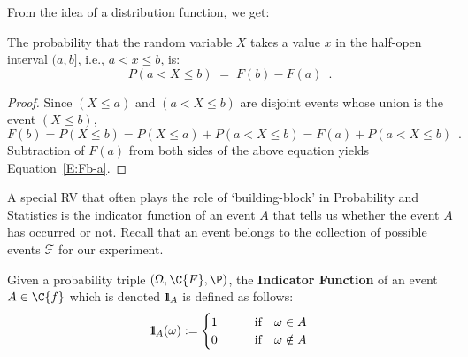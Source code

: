 From the idea of a distribution function, we get:

\begin{framed}
\begin{prop}
The probability that the random variable $X$ takes a value $x$ in the half-open interval $(a,b]$, i.e., $a < x \leq b$, is:
\begin{equation}\label{E:Fb-a}
P(a < X \leq b)\; = \;F(b) - F(a)\enspace .
\end{equation}
\end{prop}
\end{framed}

{\scriptsize
\begin{proof}
Since  $(X \leq a)$ and $(a < X \leq b)$ are disjoint events whose union is the event $(X \leq b)$,
\[
F(b)  = P(X \leq b) = P(X \leq a) + P(a < X \leq b) = F(a) + P (a < X \leq b) \enspace .
\]
Subtraction of $F(a)$ from both sides of the above equation yields
Equation~\ref{E:Fb-a}.
\end{proof}
}


A special RV that often plays the role of `building-block' in Probability and Statistics is the indicator function of an event $A$ that tells us whether the event $A$ has occurred or not.  Recall that an event belongs to the collection of possible events $\mathcal{F}$ for our experiment.
\begin{definition}
Given a probability triple $(\Omega,\C{F},\P)$, the {\bf Indicator Function} of an event $A \in \C{f}$ which is denoted ${1}\mspace{-11 mu}{1}_A$ is defined as follows:
\begin{equation}
{1}\mspace{-11 mu}{1}_A(\omega) := 
\begin{cases}
1 & \qquad \text{if} \quad \omega \in A \\
0 & \qquad \text{if} \quad \omega \notin A
\end{cases}
\end{equation}
\end{definition}


